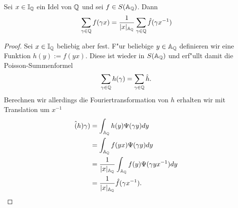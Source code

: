 	\begin{satz}
		Sei $x \in \mathbb{I}_{\mathbb{Q}}$ ein Idel von $\mathbb{Q}$ und sei $f\in S(\mathbb{A}_{\mathbb{Q}})$. Dann
		\begin{align*}
			\sum_{\gamma \in \mathbb{Q}} {f(\gamma x)} = \frac{1}{|x|_{\mathbb{A}_{\mathbb{Q}}}}\sum_{\gamma \in \mathbb{Q}} {\hat{f}(\gamma x^{-1})}
		\end{align*}
	\end{satz}
	\begin{proof}
	Sei $x \in \mathbb{I}_{\mathbb{Q}}$ beliebig aber fest. F"ur beliebige $y \in \mathbb{A}_{\mathbb{Q}}$ definieren wir eine Funktion $h(y):=f(yx)$. Diese ist wieder in $S(\mathbb{A}_{\mathbb{Q}})$ und erf"ullt damit die Poisson-Summenformel
		\begin{align*}
			\sum_{\gamma \in \mathbb{Q}}h(\gamma) = \sum_{\gamma \in \mathbb{Q}} \hat{h}.
		\end{align*}
		Berechnen wir allerdings die Fouriertransformation von $h$ erhalten wir mit Translation um $x^{-1}$
		\begin{align*}
			\hat(h){\gamma}) &= \int_{\mathbb{A}_{\mathbb{Q}}}h(y)\Psi(\gamma y)dy \\
							 &= \int_{\mathbb{A}_{\mathbb{Q}}}f(yx)\Psi(\gamma y)dy \\
							 &= \frac{1}{|x|_{\mathbb{A}_{\mathbb{Q}}}} \int_{\mathbb{A}_{\mathbb{Q}}}f(y)\Psi(\gamma y x^{-1})dy \\
							 &= \frac{1}{|x|_{\mathbb{A}_{\mathbb{Q}}}} \hat{f}(\gamma x^{-1}).
		\end{align*}
	\end{proof}